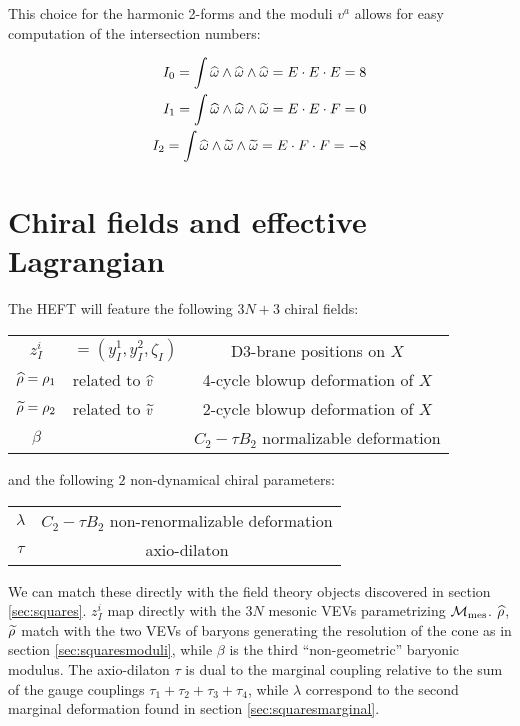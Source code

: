 This choice for the harmonic 2-forms and the moduli $v^a$ allows for easy computation of the intersection numbers:

\begin{align}
	I_0 = \int \widehat{\omega} \wedge \widehat{\omega} \wedge \widehat{\omega} = E \cdot E \cdot E  = 8 \\
	I_1 = \int \widehat{\omega} \wedge \widehat{\omega} \wedge \widetilde{\omega} = E \cdot E \cdot F  = 0\\
	I_2 = \int \widehat{\omega} \wedge \widetilde{\omega} \wedge \widetilde{\omega} = E \cdot F \cdot F = -8
	\label{}
\end{align}


\section{Chiral fields and effective Lagrangian}

The HEFT will feature the following $3N + 3$ chiral fields:

\begin{center}\begin{tabular}{c | l c}
	$z_I^i$ & $= (y_I^1, y_I^2, \zeta_I)$ & D3-brane positions on $X$\\
	$\widehat{\rho} = \rho_1$ & related to $\widehat{v}$ & 4-cycle blowup deformation of $X$\\
	$\widetilde{\rho} = \rho_2$ & related to $\widetilde{v}$ & 2-cycle blowup deformation of $X$\\
	$\beta$ &  & $C_2 - \tau B_2$ normalizable deformation
\end{tabular}\end{center}


and the following $2$ non-dynamical chiral parameters:

\begin{center}
\begin{tabular}{c | c}
	$\lambda$ &  $C_2 - \tau B_2$ non-renormalizable deformation\\
	$\tau$ &  axio-dilaton
\end{tabular}\end{center}

We can match these directly with the field theory objects discovered in section \ref{sec:squares}. $z_I^i$ map directly with the $3N$ mesonic VEVs parametrizing $\mathcal{M}_\mathrm{mes}$. $\widehat{\rho}$, $\widetilde{\rho}$ match with the two VEVs of baryons generating the resolution of the cone as in section \ref{sec:squaresmoduli}, while $\beta$ is the third ``non-geometric'' baryonic modulus. The axio-dilaton $\tau$ is dual to the marginal coupling relative to the sum of the gauge couplings $\tau_1 + \tau_2 + \tau_3 + \tau_4$, while $\lambda$ correspond to the second marginal deformation found in section \ref{sec:squaresmarginal}.

